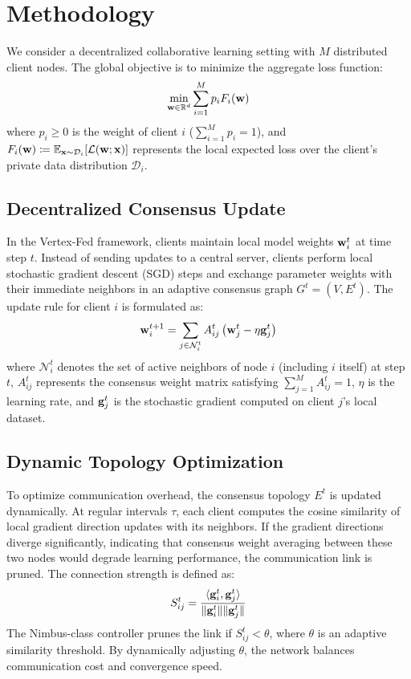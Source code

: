 \section{Methodology}
\label{sec:method}
We consider a decentralized collaborative learning setting with $M$ distributed client nodes. The global objective is to minimize the aggregate loss function:
\begin{equation}
\min_{\mathbf{w} \in \mathbb{R}^d} \sum_{i=1}^M p_i F_i(\mathbf{w})
\end{equation}
where $p_i \ge 0$ is the weight of client $i$ ($\sum_{i=1}^M p_i = 1$), and $F_i(\mathbf{w}) \coloneqq \mathbb{E}_{\mathbf{x} \sim \mathcal{D}_i} [\mathcal{L}(\mathbf{w}; \mathbf{x})]$ represents the local expected loss over the client's private data distribution $\mathcal{D}_i$.

\subsection{Decentralized Consensus Update}
In the Vertex-Fed framework, clients maintain local model weights $\mathbf{w}_i^t$ at time step $t$. Instead of sending updates to a central server, clients perform local stochastic gradient descent (SGD) steps and exchange parameter weights with their immediate neighbors in an adaptive consensus graph $G^t = (V, E^t)$. The update rule for client $i$ is formulated as:
\begin{equation}
\mathbf{w}_i^{t+1} = \sum_{j \in \mathcal{N}_i^t} A_{ij}^t \left( \mathbf{w}_j^t - \eta \mathbf{g}_j^t \right)
\end{equation}
where $\mathcal{N}_i^t$ denotes the set of active neighbors of node $i$ (including $i$ itself) at step $t$, $A_{ij}^t$ represents the consensus weight matrix satisfying $\sum_{j=1}^M A_{ij}^t = 1$, $\eta$ is the learning rate, and $\mathbf{g}_j^t$ is the stochastic gradient computed on client $j$'s local dataset.

\subsection{Dynamic Topology Optimization}
To optimize communication overhead, the consensus topology $E^t$ is updated dynamically. At regular intervals $\tau$, each client computes the cosine similarity of local gradient direction updates with its neighbors. If the gradient directions diverge significantly, indicating that consensus weight averaging between these two nodes would degrade learning performance, the communication link is pruned. The connection strength is defined as:
\begin{equation}
S_{ij}^t = \frac{\langle \mathbf{g}_i^t, \mathbf{g}_j^t \rangle}{\|\mathbf{g}_i^t\| \|\mathbf{g}_j^t\|}
\end{equation}
The Nimbus-class controller prunes the link if $S_{ij}^t < \theta$, where $\theta$ is an adaptive similarity threshold. By dynamically adjusting $\theta$, the network balances communication cost and convergence speed.

